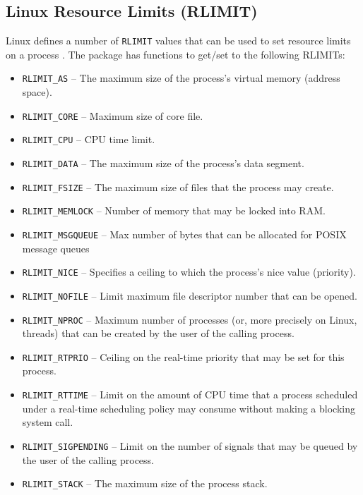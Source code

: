 \documentclass{jss}
\newcommand{\RAppArmor}{\pkg{RAppArmor}\xspace}
\begin{document}
\subsection{Linux Resource Limits (RLIMIT)}
\label{RLIMITS}

Linux defines a number of \texttt{RLIMIT} values that can be used to set
resource limits on a process \citep{linuxrlimit}. The \RAppArmor package
has functions to get/set to the following RLIMITs:

\begin{itemize}
  \item \texttt{RLIMIT\_AS} -- The maximum size of the process's virtual memory
  (address space).
  \item \texttt{RLIMIT\_CORE} -- Maximum size of core file.
  \item \texttt{RLIMIT\_CPU} -- CPU time limit.
  \item \texttt{RLIMIT\_DATA} --  The maximum size of the process's data
  segment.
  \item \texttt{RLIMIT\_FSIZE} --  The maximum size of files that the process
  may create.
  \item \texttt{RLIMIT\_MEMLOCK} -- Number of memory that may be locked into
  RAM.
  \item \texttt{RLIMIT\_MSGQUEUE} -- Max number of bytes that can be allocated
  for POSIX message queues
  \item \texttt{RLIMIT\_NICE} --  Specifies a ceiling to which the process's
  nice value (priority).
  \item \texttt{RLIMIT\_NOFILE} -- Limit maximum file descriptor number that can
  be opened.
  \item \texttt{RLIMIT\_NPROC} -- Maximum number of processes (or, more
  precisely on Linux, threads) that can be created by the user of the calling process.
  \item \texttt{RLIMIT\_RTPRIO} -- Ceiling on the real-time priority that may be
  set for this process.
  \item \texttt{RLIMIT\_RTTIME} -- Limit on the amount of CPU time that a
  process scheduled under a real-time scheduling policy may consume without making a blocking system call.
  \item \texttt{RLIMIT\_SIGPENDING} -- Limit on the number of signals that may
  be queued by the user of the calling process.
  \item \texttt{RLIMIT\_STACK} -- The maximum size of the process stack.
\end{itemize}
\end{document}
